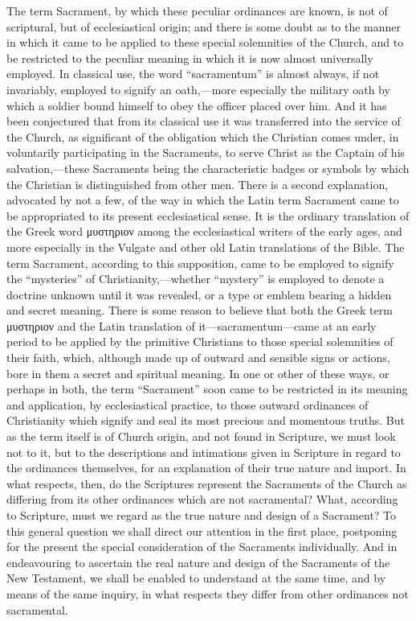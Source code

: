 \documentclass[]{book}
\begin{document}
The term Sacrament, by which these peculiar ordinances are known, is not of scriptural, but of ecclesiastical origin; and there is some doubt as to the manner in which it came to be applied to these special solemnities of the Church, and to be restricted to the peculiar meaning in which it is now almost universally employed. In classical use, the word ``sacramentum'' is almost always, if not invariably, employed to signify an oath,---more especially the military oath by which a soldier bound himself to obey the officer placed over him. And it has been conjectured that from its classical use it was transferred into the service of the Church, as significant of the obligation which the Christian comes under, in voluntarily participating in the Sacraments, to serve Christ as the Captain of his salvation,---these Sacraments being the characteristic badges or symbols by which the Christian is distinguished from other men. There is a second explanation, advocated by not a few, of the way in which the Latin term Sacrament came to be appropriated to its present ecclesiastical sense. It is the ordinary translation of the Greek word μυστηριον among the ecclesiastical writers of the early ages, and more especially in the Vulgate and other old Latin translations of the Bible. The term Sacrament, according to this supposition, came to be employed to signify the ``mysteries'' of Christianity,---whether ``mystery'' is employed to denote a doctrine unknown until it was revealed, or a type or emblem bearing a hidden and secret meaning. There is some reason to believe that both the Greek term μυστηριον and the Latin translation of it---sacramentum---came at an early period to be applied by the primitive Christians to those special solemnities of their faith, which, although made up of outward and sensible signs or actions, bore in them a secret and spiritual meaning. In one or other of these ways, or perhaps in both, the term ``Sacrament'' soon came to be restricted in its meaning and application, by ecclesiastical practice, to those outward ordinances of Christianity which signify and seal its most precious and momentous truths. But as the term itself is of Church origin, and not found in Scripture, we must look not to it, but to the descriptions and intimations given in Scripture in regard to the ordinances themselves, for an explanation of their true nature and import. In what respects, then, do the Scriptures represent the Sacraments of the Church as differing from its other ordinances which are not sacramental? What, according to Scripture, must we regard as the true nature and design of a Sacrament? To this general question we shall direct our attention in the first place, postponing for the present the special consideration of the Sacraments individually. And in endeavouring to ascertain the real nature and design of the Sacraments of the New Testament, we shall be enabled to understand at the same time, and by means of the same inquiry, in what respects they differ from other ordinances not sacramental.
\end{document}
